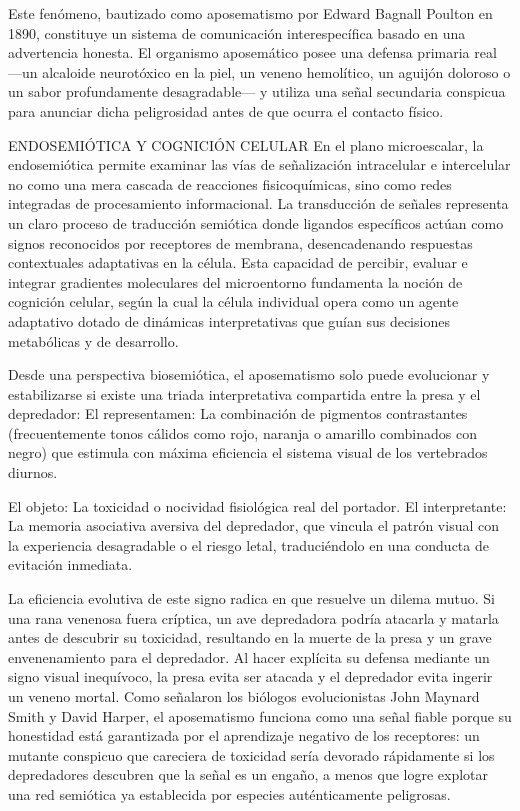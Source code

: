 Este fenómeno, bautizado como aposematismo por Edward Bagnall Poulton en 1890, constituye un sistema de comunicación interespecífica basado en una advertencia honesta. 
El organismo aposemático posee una defensa primaria real —un alcaloide neurotóxico en la piel, un veneno hemolítico, un aguijón doloroso o un sabor profundamente desagradable— y utiliza una señal secundaria conspicua para anunciar dicha peligrosidad antes de que ocurra el contacto físico.

ENDOSEMIÓTICA Y COGNICIÓN CELULAR
En el plano microescalar, la endosemiótica permite examinar las vías de señalización intracelular e intercelular no como una mera cascada de reacciones fisicoquímicas, sino como redes integradas de procesamiento informacional. La transducción de señales representa un claro proceso de traducción semiótica donde ligandos específicos actúan como signos reconocidos por receptores de membrana, desencadenando respuestas contextuales adaptativas en la célula. Esta capacidad de percibir, evaluar e integrar gradientes moleculares del microentorno fundamenta la noción de cognición celular, según la cual la célula individual opera como un agente adaptativo dotado de dinámicas interpretativas que guían sus decisiones metabólicas y de desarrollo.

Desde una perspectiva biosemiótica, el aposematismo solo puede evolucionar y estabilizarse si existe una triada interpretativa compartida entre la presa y el depredador:
El representamen: La combinación de pigmentos contrastantes (frecuentemente tonos cálidos como rojo, naranja o amarillo combinados con negro) que estimula con máxima eficiencia el sistema visual de los vertebrados diurnos.

El objeto: La toxicidad o nocividad fisiológica real del portador.
El interpretante: La memoria asociativa aversiva del depredador, que vincula el patrón visual con la experiencia desagradable o el riesgo letal, traduciéndolo en una conducta de evitación inmediata.

La eficiencia evolutiva de este signo radica en que resuelve un dilema mutuo.
Si una rana venenosa fuera críptica, un ave depredadora podría atacarla y matarla antes de descubrir su toxicidad, resultando en la muerte de la presa y un grave envenenamiento para el depredador. 
Al hacer explícita su defensa mediante un signo visual inequívoco, la presa evita ser atacada y el depredador evita ingerir un veneno mortal. Como señalaron los biólogos evolucionistas John Maynard Smith y David Harper, el aposematismo funciona como una señal fiable porque su honestidad está garantizada por el aprendizaje negativo de los receptores: 
un mutante conspicuo que careciera de toxicidad sería devorado rápidamente si los depredadores descubren que la señal es un engaño, a menos que logre explotar una red semiótica ya establecida por especies auténticamente peligrosas.

